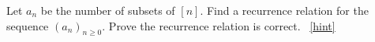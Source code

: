 \documentclass{book}
\begin{document}
\setcounter{project}{134}
\addtocounter{project}{-1}
\begin{activity}[]\label{activity-127}
\hypertarget{p-944}{}%
Let \(a_n\) be the number of subsets of \([n]\).  Find a recurrence relation for the sequence \((a_n)_{n \ge 0}\).  Prove the recurrence relation is correct.%
~\hfill{\tiny\hyperlink{a-134}{[hint]}\hypertarget{q-134}{}}\end{activity}
\end{document}
